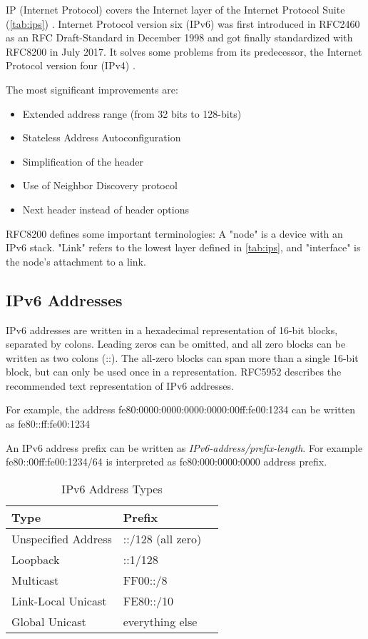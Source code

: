 IP (Internet Protocol) covers the Internet layer of the Internet Protocol Suite (\autoref{tab:ips}) \cite{rfc1122}.
Internet Protocol version six (IPv6) was first introduced in RFC2460 \cite{rfc2460} as an RFC Draft-Standard in December 1998
and got finally standardized with RFC8200 \cite{rfc8200} in July 2017.
It solves some problems from its predecessor, the Internet Protocol version four (IPv4) \cite{rfc791}.

The most significant improvements are:

\begin{itemize}
	\item Extended address range (from 32 bits to 128-bits)
	\item Stateless Address Autoconfiguration
	\item Simplification of the header
	\item Use of Neighbor Discovery protocol
	\item Next header instead of header options
\end{itemize}

RFC8200 defines some important terminologies:
A "node" is a device with an IPv6 stack.
"Link" refers to the lowest layer defined in \autoref{tab:ips}, and
"interface" is the node's attachment to a link.

\subsection{IPv6 Addresses}
\label{sec:ipv6_addr}

IPv6 addresses are written in a hexadecimal representation of 16-bit blocks, separated by colons.
Leading zeros can be omitted, and all zero blocks can be written as two colons (::).
The all-zero blocks can span more than a single 16-bit block, but can only be used once in a representation.
RFC5952 \cite{rfc5952} describes the recommended text representation of IPv6 addresses.

For example, the address fe80:0000:0000:0000:0000:00ff:fe00:1234 can be written as fe80::ff:fe00:1234

An IPv6 address prefix can be written as \textit{IPv6-address/prefix-length}.
For example fe80::00ff:fe00:1234/64 is interpreted as fe80:000:0000:0000 address prefix.

\begin{table}
	\centering
	\caption{IPv6 Address Types}
	\begin{tabular}{|l|l|l|} \hline
	Type                & Prefix            \\ \hline \hline
	Unspecified Address & ::/128 (all zero) \\ \hline
	Loopback            & ::1/128           \\ \hline
	Multicast           & FF00::/8          \\ \hline
	Link-Local Unicast  & FE80::/10         \\ \hline
	Global Unicast      & everything else   \\ \hline
	\end{tabular}
	\label{tab:ipv6_addr_types}
\end{table}


